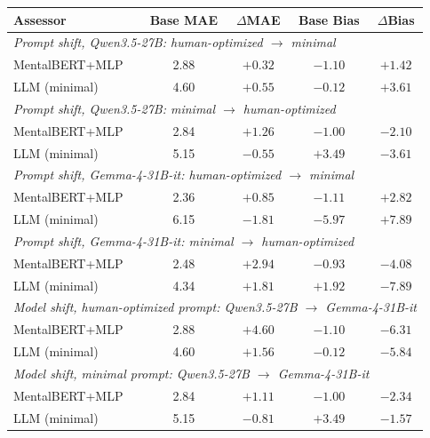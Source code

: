 \begin{tabular}{lcccc}
\toprule
Assessor & Base MAE & $\Delta$MAE & Base Bias & $\Delta$Bias \\
\midrule
\multicolumn{5}{l}{\textit{Prompt shift, Qwen3.5-27B: human-optimized $\rightarrow$ minimal}} \\
MentalBERT+MLP & 2.88 & $+0.32$ & $-1.10$ & $+1.42$ \\
LLM (minimal) & 4.60 & $+0.55$ & $-0.12$ & $+3.61$ \\
\midrule
\multicolumn{5}{l}{\textit{Prompt shift, Qwen3.5-27B: minimal $\rightarrow$ human-optimized}} \\
MentalBERT+MLP & 2.84 & $+1.26$ & $-1.00$ & $-2.10$ \\
LLM (minimal) & 5.15 & $-0.55$ & $+3.49$ & $-3.61$ \\
\midrule
\multicolumn{5}{l}{\textit{Prompt shift, Gemma-4-31B-it: human-optimized $\rightarrow$ minimal}} \\
MentalBERT+MLP & 2.36 & $+0.85$ & $-1.11$ & $+2.82$ \\
LLM (minimal) & 6.15 & $-1.81$ & $-5.97$ & $+7.89$ \\
\midrule
\multicolumn{5}{l}{\textit{Prompt shift, Gemma-4-31B-it: minimal $\rightarrow$ human-optimized}} \\
MentalBERT+MLP & 2.48 & $+2.94$ & $-0.93$ & $-4.08$ \\
LLM (minimal) & 4.34 & $+1.81$ & $+1.92$ & $-7.89$ \\
\midrule
\multicolumn{5}{l}{\textit{Model shift, human-optimized prompt: Qwen3.5-27B $\rightarrow$ Gemma-4-31B-it}} \\
MentalBERT+MLP & 2.88 & $+4.60$ & $-1.10$ & $-6.31$ \\
LLM (minimal) & 4.60 & $+1.56$ & $-0.12$ & $-5.84$ \\
\midrule
\multicolumn{5}{l}{\textit{Model shift, minimal prompt: Qwen3.5-27B $\rightarrow$ Gemma-4-31B-it}} \\
MentalBERT+MLP & 2.84 & $+1.11$ & $-1.00$ & $-2.34$ \\
LLM (minimal) & 5.15 & $-0.81$ & $+3.49$ & $-1.57$ \\
\bottomrule
\end{tabular}
